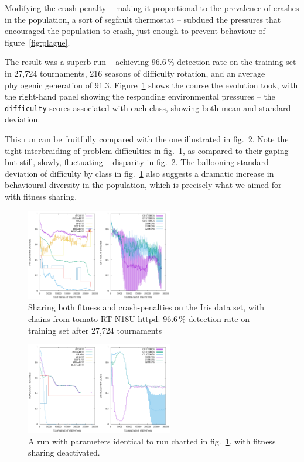 Modifying the crash penalty -- making it proportional to the
prevalence of crashes in the population, a sort of segfault
thermostat -- subdued the
pressures that encouraged the population to crash, just enough to
prevent behaviour of figure~\ref{fig:plague}.

The result was a superb run -- achieving 96.6\,\% detection rate on
the training set in 27,724 tournaments, 216 seasons of
difficulty rotation, and an average
phylogenic generation of 91.3. Figure~\ref{fig:okay} shows the
course the evolution took, with the right-hand panel showing the
responding environmental pressures -- the \texttt{difficulty} scores associated
with each class, showing both mean and standard deviation.

This run can be fruitfully compared with the one illustrated in fig.~\ref{fig:nosharing}.
Note the tight interbraiding of problem difficulties in fig.~\ref{fig:okay}, as compared to their
gaping -- but still, slowly, fluctuating -- disparity in fig.~\ref{fig:nosharing}. The 
ballooning standard deviation of difficulty by class in fig.~\ref{fig:okay} also suggests
a dramatic increase in behavioural diversity in the population, which is precisely what
we aimed for with fitness sharing.

\begin{figure}
  \includegraphics[height=4cm,width=\columnwidth]{examples/iris/sharing3/sharing3_white.png}
  \caption{Sharing both fitness and crash-penalties on the Iris
  data set, with chains from tomato-RT-N18U-httpd: 96.6\,\%
  detection rate on training set after 27,724 tournaments}
  \label{fig:okay}
\end{figure}

\begin{figure}
  \includegraphics[height=4cm, width=\columnwidth]{examples/iris/nosharing-diff/nosharing-white.png}
  \caption{A run with parameters identical to run charted in fig.~\ref{fig:okay}, with fitness sharing
    deactivated.}
  \label{fig:nosharing}
\end{figure}

